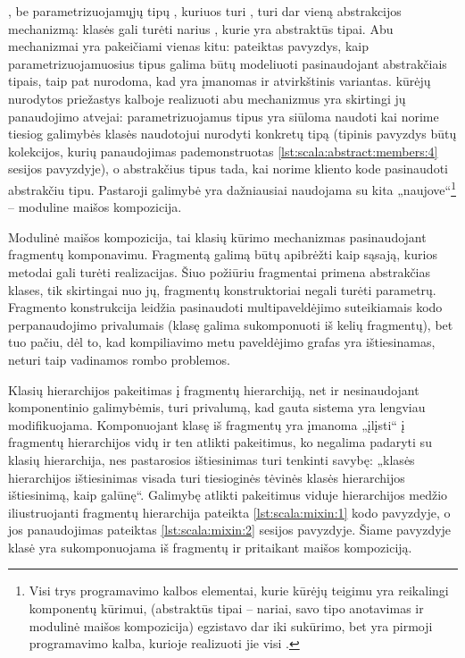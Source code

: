 , be parametrizuojamųjų tipų , kuriuos
turi , turi dar vieną abstrakcijos mechanizmą:
 klasės gali turėti narius , kurie
yra abstraktūs tipai. Abu mechanizmai yra pakeičiami vienas kitu:
\cite[10]{scala-overview} pateiktas pavyzdys, kaip parametrizuojamuosius
tipus galima būtų modeliuoti pasinaudojant abstrakčiais tipais, taip
pat nurodoma, kad yra įmanomas ir atvirkštinis variantas.
 kūrėjų \cite[11]{scala-overview} nurodytos
priežastys kalboje realizuoti abu mechanizmus yra skirtingi jų
panaudojimo atvejai: parametrizuojamus tipus yra siūloma naudoti kai
norime tiesiog galimybės klasės naudotojui nurodyti konkretų tipą
(tipinis pavyzdys būtų kolekcijos, kurių panaudojimas pademonstruotas
\ref{lst:scala:abstract:members:4}  sesijos
pavyzdyje), o abstrakčius tipus tada, kai norime kliento kode
pasinaudoti abstrakčiu tipu. Pastaroji galimybė yra dažniausiai
naudojama su kita  „naujove“\footnote{
Visi trys programavimo kalbos elementai, kurie 
kūrėjų teigimu yra reikalingi komponentų kūrimui, (abstraktūs
tipai – nariai, savo tipo anotavimas ir modulinė maišos kompozicija)
egzistavo dar iki  sukūrimo, bet 
yra pirmoji programavimo kalba, kurioje realizuoti jie visi
\cite[2]{scalable-component-abstractions}.} – moduline maišos
kompozicija.


Modulinė maišos kompozicija, tai klasių kūrimo mechanizmas
pasinaudojant fragmentų  komponavimu. Fragmentą galimą
būtų apibrėžti kaip sąsają, kurios metodai gali turėti
realizacijas. Šiuo požiūriu fragmentai primena abstrakčias klases,
tik skirtingai nuo jų, fragmentų konstruktoriai negali turėti
parametrų. Fragmento konstrukcija leidžia pasinaudoti
multipaveldėjimo suteikiamais kodo perpanaudojimo privalumais
(klasę galima sukomponuoti iš kelių fragmentų), bet tuo pačiu, dėl
to, kad kompiliavimo metu paveldėjimo grafas yra ištiesinamas, neturi
taip vadinamos rombo problemos.

Klasių hierarchijos pakeitimas į fragmentų hierarchiją, net ir
nesinaudojant komponentinio galimybėmis, turi privalumą, kad
gauta sistema yra lengviau modifikuojama. Komponuojant klasę iš
fragmentų yra įmanoma „įlįsti“ į fragmentų hierarchijos vidų
ir ten atlikti pakeitimus, ko negalima padaryti su klasių hierarchija,
nes pastarosios ištiesinimas turi tenkinti savybę: „klasės hierarchijos
ištiesinimas visada turi tiesioginės tėvinės klasės hierarchijos
ištiesinimą, kaip galūnę“\cite[57]{scala-reference}. Galimybę
atlikti pakeitimus viduje hierarchijos medžio iliustruojanti fragmentų
hierarchija pateikta \ref{lst:scala:mixin:1} kodo pavyzdyje,
o jos panaudojimas pateiktas \ref{lst:scala:mixin:2} 
sesijos pavyzdyje. Šiame pavyzdyje klasė  yra sukomponuojama
iš fragmentų  ir  pritaikant maišos kompoziciją.

